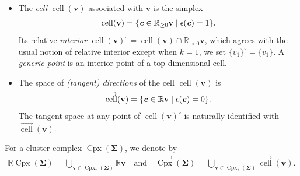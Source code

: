 \documentclass[11pt,reqno]{amsart}
\theoremstyle{plain}
\theoremstyle{definition}
\numberwithin{equation}{section}
\newcommand\RR{\mathbb{R}}
\newcommand\<{\langle}
\renewcommand\>{\rangle}
\newcommand{\on}[1]{\operatorname{#1}}
\def\CCx{\on{Cpx}}   %
\def\cc{\on{cell}}  %
\def\dcc{\overrightarrow{\on{cell}}}
\def\Star{\on{Star}}    %
\def\vv{\mathbf{v}}
\newcommand{\ccpt}[1]{\mathrm{#1}}%
\newcommand{\bfit}[1]{\textbf{\textit{#1}}}
\def\seeds{\mathbf{\Sigma}}
\def\cvec{\bfit{c}}
\newcommand{\ol}[1]{\overline{#1}}
\def\sCpx{\RR\CCx}
\def\dCpx{\overrightarrow{\CCx}}
\def\csum{\epsilon}
\begin{document}
\begin{itemize}
    \item The \emph{cell} $\cc(\vv)$ associated with $\vv$ is the simplex
    \begin{gather}\label{eq:cc}
    \cc(\vv)=\{\cvec\in\RR_{\ge0}\vv \mid \csum(\cvec)=1 \}.%
    \end{gather}
    Its relative \emph{interior} $\cc(\vv)^\circ=\cc(\vv)\cap\RR_{>0}\vv$,
    which agrees with the usual notion of relative interior except when $k=1$, we set $\{v_1\}^\circ=\{v_1\}$. 
    A \emph{generic point} is an interior point of a top-dimensional cell.

     \item
    The space of \emph{(tangent) directions} of the cell $\cc(\vv)$ is
    \begin{gather}\label{eq:dcc}
        \dcc(\vv)=\{\cvec\in\RR\vv \mid \epsilon(\cvec)=0\}.
    \end{gather}
    The tangent space at any point of $\cc(\vv)^\circ$ is naturally identified with $\dcc(\vv)$.
    
\end{itemize}
For a cluster complex $\CCx(\seeds)$, we denote by
\begin{gather}\label{eq:direct}
    \sCpx(\seeds)=\bigcup_{\vv\in\CCx_*(\seeds)}\RR\vv
    \quad\text{and}\quad
    \dCpx(\seeds)=\bigcup_{\vv\in\CCx_*(\seeds)}\dcc(\vv).
\end{gather}
\end{document}

